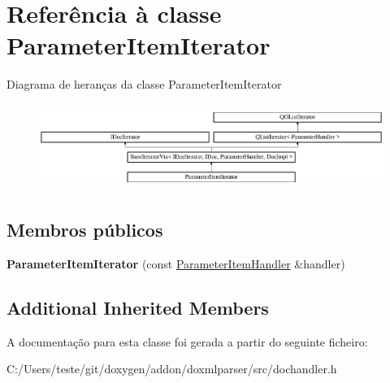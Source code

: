 \hypertarget{class_parameter_item_iterator}{\section{Referência à classe Parameter\-Item\-Iterator}
\label{class_parameter_item_iterator}
}
Diagrama de heranças da classe Parameter\-Item\-Iterator\begin{figure}[H]
\begin{center}
\leavevmode
\includegraphics[height=2.814070cm]{class_parameter_item_iterator}
\end{center}
\end{figure}
\subsection*{Membros públicos}
\begin{DoxyCompactItemize}
\item 
\hypertarget{class_parameter_item_iterator_a2f55c12f042d711fa9ae1348dedf86e0}{{\bfseries Parameter\-Item\-Iterator} (const \hyperlink{class_parameter_item_handler}{Parameter\-Item\-Handler} \&handler)}\label{class_parameter_item_iterator_a2f55c12f042d711fa9ae1348dedf86e0}

\end{DoxyCompactItemize}
\subsection*{Additional Inherited Members}


A documentação para esta classe foi gerada a partir do seguinte ficheiro\-:\begin{DoxyCompactItemize}
\item 
C\-:/\-Users/teste/git/doxygen/addon/doxmlparser/src/dochandler.\-h\end{DoxyCompactItemize}
